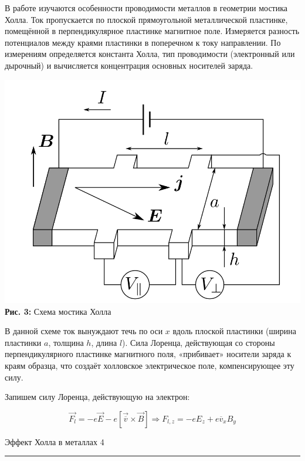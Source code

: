 \documentclass[12pt,a4paper]{scrartcl}
\begin{document}
	В работе изучаются особенности проводимости металлов в геометрии мостика Холла. Ток пропускается по плоской прямоугольной металлической пластинке, помещённой в перпендикулярное пластинке магнитное поле. Измеряется разность потенциалов между краями пластинки в по­перечном к току направлении. По измерениям определяется константа Холла, тип проводимости (электронный или дырочный) и вычисляется концентрация основных носителей заряда.
	
	\begin{center}
		\includegraphics[scale=0.25]{PIC_3.png}
		\\\textbf{Рис. 3:} Схема мостика Холла
	\end{center}
	
	В данной схеме ток вынуждают течь по оси $x$ вдоль плоской пластинки (ширина пластинки $a$, толщина $h$,
	длина $l$). Сила Лоренца, действующая со стороны перпендикулярного пластинке магнитного поля, «прибивает» носители заряда к краям образца, что создаёт холловское электрическое поле, компенсирующее эту	силу. 
	
	Запишем силу Лоренца, действующую на электрон:
	
	$$\vec{F_l} = -e\vec{E} - e\left[\vec{\overline{v}} \times \vec{B}\right] \Rightarrow F_{l, z} = -e E_z + e \overline{v}_x B_y$$
	
	\newpage
	
	
	\begin{flushleft}
		\footnotesize{Эффект Холла в металлах} \hspace{\fill} \footnotesize{4}
		\\[-0.3cm]\noindent\rule{\textwidth}{0.3pt}
	\end{flushleft}	
	
\end{document}
